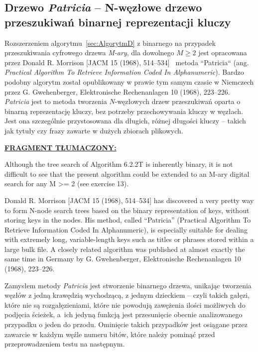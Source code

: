 	\subsection{Drzewo \emph{Patricia} -- N-węzłowe drzewo przeszukiwań binarnej reprezentacji kluczy}\label{sec:DrzewoPatricia}
	
	Rozszerzeniem algorytmu~\ref{sec:AlgorytmD} z binarnego na przypadek przeszukiwania cyfrowego drzewa \emph{M-ary}, dla dowolnego $M \geq 2$ jest opracowana przez Donald R. Morrison [JACM 15 (1968), 514–534]~\cite{PatriciaDonaldRMorrison} metoda ``Patricia`` (ang. \emph{Practical Algorithm To Retrieve Information Coded In Alphanumeric}). Bardzo podobny algorytm został opublikowany w prawie tym samym czasie w Niemczech przez G. Gwehenberger, Elektronische Rechenanlagen 10 (1968), 223–226. \emph{Patricia} jest to metoda tworzenia $N$-węzłowych drzew przeszukiwań oparta o binarną reprezentację kluczy, bez potrzeby przechowywania kluczy w węzłach. Jest ona szczególnie przystosowana dla długich, różnej długości kluczy -- takich jak tytuły czy frazy zawarte w dużych zbiorach plikowych. 
	
	\ifsourcematerial
	\begin{displayquote}
		\color{ao(english)}
		\underline{\textbf{FRAGMENT TŁUMACZONY:}} \newline 
		
		Although the tree search of Algorithm 6.2.2T is inherently binary, it is not
		difficult to see that the present algorithm could be extended to an M-ary digital
		search for any M >= 2 (see exercise 13). \newline
		
		Donald R. Morrison [JACM 15 (1968), 514–534] has discovered a very
		pretty way to form N-node search trees based on the binary representation of
		keys, without storing keys in the nodes. His method, called “Patricia” (Practical
		Algorithm To Retrieve Information Coded In Alphanumeric), is especially
		suitable for dealing with extremely long, variable-length keys such as titles or
		phrases stored within a large bulk file. A closely related algorithm was published
		at almost exactly the same time in Germany by G. Gwehenberger, Elektronische
		Rechenanlagen 10 (1968), 223–226. \newline
	\end{displayquote} 
	\fi
	
	Zamysłem metody \emph{Patricia} jest stworzenie binarnego drzewa, unikając tworzenia węzłów z jedną krawędzią wychodzącą, z jednym dzieckiem -- czyli takich gałęzi, które nie są rozgałęzieniami, które nie powodują zawężenia ilości możliwych do podjęcia ścieżek, a~ich jedyną funkcją jest przesunięcie obecnie analizowanego przypadku o jeden do przodu. Ominięcie takich przypadków jest osiągane przez zawarcie w każdym węźle numeru bitów, które należy pominąć przed przeprowadzeniem testu na następnym.
	
